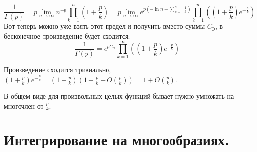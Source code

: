 \documentclass{article}
\begin{document}
    \begin{property}
        $$
        \frac1{\Gamma(p)}=p\lim\limits_{n\to\infty}n^{-p}\prod\limits_{k=1}^n\left(1+\frac pk\right)=p\lim\limits_{n\to\infty}e^{p\left(-\ln n+\sum\limits_{k=1}^n\frac1k\right)}\prod\limits_{k=1}^n\left(\left(1+\frac pk\right)e^{-\frac pk}\right)
        $$
        Вот теперь можно уже взять этот предел и получить вместо суммы $C_{\text{Э}}$, в бесконечное произведение будет сходится:
        $$
        \frac1{\Gamma(p)}=e^{pC_{\text{Э}}}\prod\limits_{k=1}^\infty\left(\left(1+\frac pk\right)e^{-\frac pk}\right)
        $$
    \end{property}
    \begin{remark}
        Произведение сходится тривиально, $\left(1+\frac pk\right)e^{-\frac pk}=\left(1+\frac pk\right)\left(1-\frac pk+O(\frac pk)\right)=1+O(\frac pk)$.
    \end{remark}
    \begin{remark}
        В общем виде для произвольных целых функций бывает нужно умножать на многочлен от $\frac pk$.
    \end{remark}
    \section{Интегрирование на многообразиях.}
\end{document}
